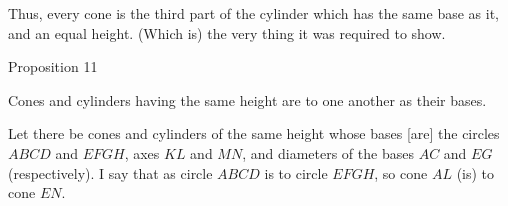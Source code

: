 Thus, every cone is the third part of the cylinder which has the same base as it, and an equal height.
(Which is) the very thing it was required to show.


\begin{center}
{\large Proposition 11}
\end{center}

Cones and cylinders having the same height are to one another as their bases.

Let there be cones and cylinders of the same height whose bases [are]  the circles $ABCD$ and $EFGH$,
axes $KL$ and $MN$, and diameters of the bases $AC$ and $EG$ (respectively). I say that as
circle $ABCD$ is to circle $EFGH$, so cone  $AL$ (is) to cone $EN$.

\epsfysize=1.3in
\centerline{}

